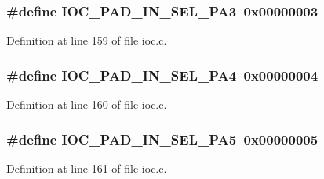 \subsubsection[{\texorpdfstring{I\+O\+C\+\_\+\+P\+A\+D\+\_\+\+I\+N\+\_\+\+S\+E\+L\+\_\+\+P\+A3}{IOC_PAD_IN_SEL_PA3}}]{\setlength{\rightskip}{0pt plus 5cm}\#define I\+O\+C\+\_\+\+P\+A\+D\+\_\+\+I\+N\+\_\+\+S\+E\+L\+\_\+\+P\+A3~0x00000003}\hypertarget{group__ioc__api_gad6dc604dd603db11019f71ffb0672147}{}\label{group__ioc__api_gad6dc604dd603db11019f71ffb0672147}


Definition at line 159 of file ioc.\+c.

\subsubsection[{\texorpdfstring{I\+O\+C\+\_\+\+P\+A\+D\+\_\+\+I\+N\+\_\+\+S\+E\+L\+\_\+\+P\+A4}{IOC_PAD_IN_SEL_PA4}}]{\setlength{\rightskip}{0pt plus 5cm}\#define I\+O\+C\+\_\+\+P\+A\+D\+\_\+\+I\+N\+\_\+\+S\+E\+L\+\_\+\+P\+A4~0x00000004}\hypertarget{group__ioc__api_ga34c3712caea44cdc645d4857688fc72c}{}\label{group__ioc__api_ga34c3712caea44cdc645d4857688fc72c}


Definition at line 160 of file ioc.\+c.

\subsubsection[{\texorpdfstring{I\+O\+C\+\_\+\+P\+A\+D\+\_\+\+I\+N\+\_\+\+S\+E\+L\+\_\+\+P\+A5}{IOC_PAD_IN_SEL_PA5}}]{\setlength{\rightskip}{0pt plus 5cm}\#define I\+O\+C\+\_\+\+P\+A\+D\+\_\+\+I\+N\+\_\+\+S\+E\+L\+\_\+\+P\+A5~0x00000005}\hypertarget{group__ioc__api_ga9cded8b488e858617fef82e9d0d434eb}{}\label{group__ioc__api_ga9cded8b488e858617fef82e9d0d434eb}


Definition at line 161 of file ioc.\+c.

